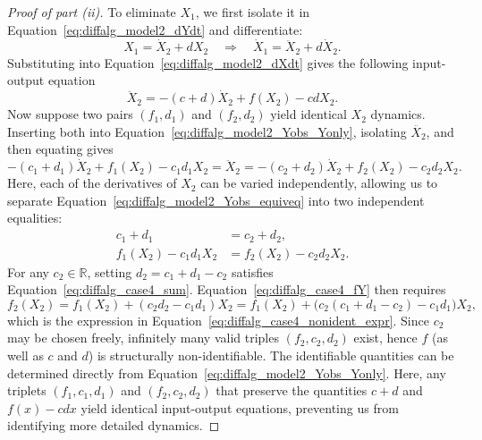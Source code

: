 \documentclass{article}
\theoremstyle{plain}
\theoremstyle{definition}
\begin{document}
{\begin{proof}[Proof of part (ii)]
To eliminate $X_1$, we first isolate it in Equation~\eqref{eq:diffalg_model2_dYdt} and differentiate:
\begin{equation*}
    X_1= \dot{X}_2 + dX_2 \quad \Longrightarrow \quad \dot{X}_1 = \ddot{X}_2 + d\dot{X}_2.
\end{equation*}
Substituting into Equation~\eqref{eq:diffalg_model2_dXdt} gives the following input-output equation
\begin{equation}
    \label{eq:diffalg_model2_Yobs_Yonly}
    \ddot{X}_2 = -(c+d)\dot{X}_2 + f(X_2) - cdX_2.
\end{equation}
Now suppose two pairs $(f_1, d_1)$ and $(f_2, d_2)$ yield identical $X_2$ dynamics. Inserting both into Equation~\eqref{eq:diffalg_model2_Yobs_Yonly}, isolating $\ddot{X_2}$, and then equating gives
\begin{equation}
    \label{eq:diffalg_model2_Yobs_equiveq}
    -(c_1+d_1)\dot{X}_2 + f_1(X_2) - c_1 d_1 X_2 = \ddot{X}_2 = -(c_2+d_2)\dot{X}_2 + f_2(X_2) - c_2 d_2 X_2.
\end{equation}
Here, each of the derivatives of $X_2$ can be varied independently, allowing us to separate Equation~\eqref{eq:diffalg_model2_Yobs_equiveq} into two independent equalities:
\begin{align}
    c_1 + d_1 &= c_2 + d_2, \label{eq:diffalg_case4_sum} \\
    f_1(X_2) - c_1 d_1 X_2 &= f_2(X_2) - c_2 d_2 X_2. \label{eq:diffalg_case4_fY}
\end{align}
For any $c_2 \in \mathbb{R}$, setting $d_2 = c_1 + d_1 - c_2$ satisfies Equation~\eqref{eq:diffalg_case4_sum}. Equation~\eqref{eq:diffalg_case4_fY} then requires
\begin{equation*}
    f_2(X_2) = f_1(X_2) + (c_2 d_2 - c_1 d_1)X_2 = f_1(X_2) + \bigl(c_2(c_1 + d_1 - c_2) - c_1 d_1\bigr)X_2,
\end{equation*}
which is the expression in Equation~\eqref{eq:diffalg_case4_nonident_expr}. Since $c_2$ may be chosen freely, infinitely many valid triples $(f_2, c_2, d_2)$ exist, hence $f$ (as well as $c$ and $d$) is structurally non-identifiable. The identifiable quantities can be determined directly from Equation~\eqref{eq:diffalg_model2_Yobs_Yonly}. Here, any triplets $(f_1,c_1,d_1)$ and $(f_2,c_2,d_2)$ that preserve the quantities $c+d$ and $f(x) - cdx$ yield identical input-output equations, preventing us from identifying more detailed dynamics.
\end{proof}

}
\end{document}
